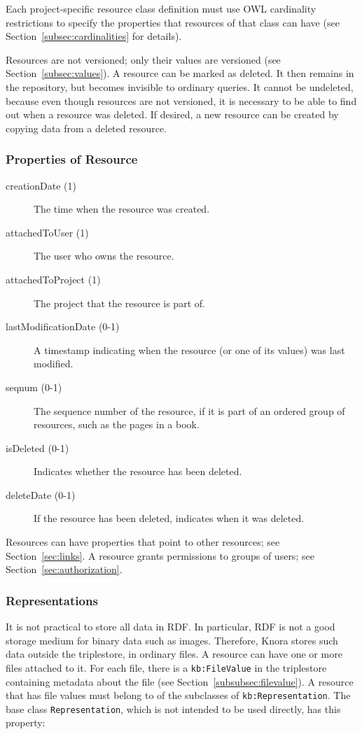 \documentclass[12pt, a4paper]{article}
\begin{document}
Each project-specific resource class definition must use OWL cardinality restrictions to specify the properties that resources of that class can have (see Section~\ref{subsec:cardinalities} for details).

Resources are not versioned; only their values are versioned (see Section~\ref{subsec:values}). A resource can be marked as deleted. It then remains in the repository, but becomes invisible to ordinary queries. It cannot be undeleted, because even though resources are not versioned, it is necessary to be able to find out when a resource was deleted. If desired, a new resource can be created by copying data from a deleted resource.

\subsubsection{Properties of Resource}

\begin{description}
  \item[creationDate (1)] The time when the resource was created.
  \item[attachedToUser (1)] The user who owns the resource.
  \item[attachedToProject (1)] The project that the resource is part of.
  \item[lastModificationDate (0-1)] A timestamp indicating when the resource (or one of its values) was last modified.
  \item[seqnum (0-1)] The sequence number of the resource, if it is part of an ordered group of resources, such as the pages in a book. 
  \item[isDeleted (0-1)] Indicates whether the resource has been deleted.
  \item[deleteDate (0-1)] If the resource has been deleted, indicates when it was deleted.
\end{description}

Resources can have properties that point to other resources; see Section~\ref{sec:links}. A resource grants permissions to groups of users; see Section~\ref{sec:authorization}.

\subsubsection{Representations}

\label{subsubsec:representations}

It is not practical to store all data in RDF. In particular, RDF is not a good storage medium for binary data such as images. Therefore, Knora stores such data outside the triplestore, in ordinary files. A resource can have one or more files attached to it. For each file, there is a \texttt{kb:FileValue} in the triplestore containing metadata about the file (see Section~\ref{subsubsec:filevalue}). A resource that has file values must belong to of the subclasses of \texttt{kb:Representation}. The base class \texttt{Representation}, which is not intended to be used directly, has this property:
\end{document}

